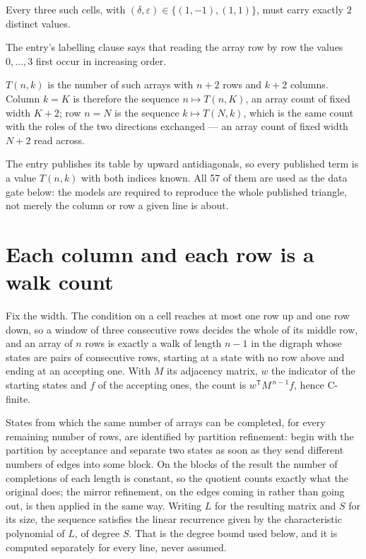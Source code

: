 \documentclass[11pt]{article}
\theoremstyle{definition}
\begin{document}
Every three such cells, with $(\delta,\varepsilon) \in \{(1,-1), (1,1)\}$, must carry exactly $2$ distinct values.

The entry's labelling clause says that reading the array row by row the values $0,\dots,3$ first occur in increasing order.

$T(n,k)$ is the number of such arrays with $n + 2$ rows and $k + 2$ columns. Column $k = K$ is therefore the sequence $n \mapsto T(n,K)$, an array count of fixed width $K + 2$; row $n = N$ is the sequence $k \mapsto T(N,k)$, which is the same count with the roles of the two directions exchanged --- an array count of fixed width $N + 2$ read across.

The entry publishes its table by upward antidiagonals, so every published term is a value $T(n,k)$ with both indices known. All 57 of them are used as the data gate below: the models are required to reproduce the whole published triangle, not merely the column or row a given line is about.

\section{Each column and each row is a walk count}

Fix the width. The condition on a cell reaches at most one row up and one row down, so a window of three consecutive rows decides the whole of its middle row, and an array of $n$ rows is exactly a walk of length $n-1$ in the digraph whose states are pairs of consecutive rows, starting at a state with no row above and ending at an accepting one. With $M$ its adjacency matrix, $w$ the indicator of the starting states and $f$ of the accepting ones, the count is $w^{\mathsf T}M^{\,n-1}f$, hence C-finite.

States from which the same number of arrays can be completed, for every remaining number of rows, are identified by partition refinement: begin with the partition by acceptance and separate two states as soon as they send different numbers of edges into some block. On the blocks of the result the number of completions of each length is constant, so the quotient counts exactly what the original does; the mirror refinement, on the edges coming in rather than going out, is then applied in the same way. Writing $L$ for the resulting matrix and $S$ for its size, the sequence satisfies the linear recurrence given by the characteristic polynomial of $L$, of degree $S$. That is the degree bound used below, and it is computed separately for every line, never assumed.
\end{document}
